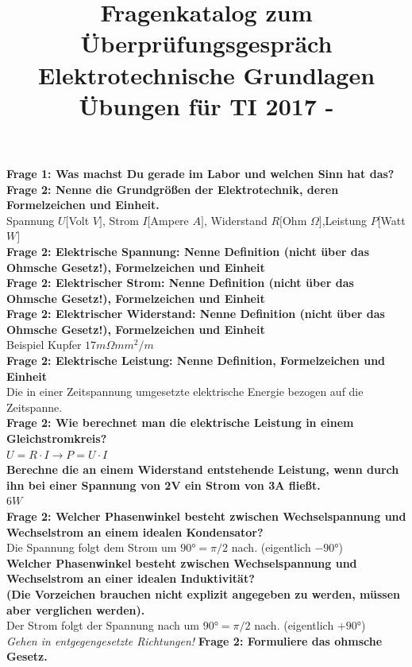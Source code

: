 \documentclass[11pt,a4paper]{scrartcl}
\title{\textbf{Fragenkatalog zum Überprüfungsgespräch Elektrotechnische Grundlagen Übungen für TI 2017 - \UE}}
\author{\name}
\begin{document}
\maketitle

\textbf{Frage 1: Was machst Du gerade im Labor und welchen Sinn hat das?}\\
\textbf{Frage 2: Nenne die Grundgrößen der Elektrotechnik, deren Formelzeichen und Einheit.}\\
Spannung $U[$Volt $V]$, Strom $I[$Ampere $A]$, Widerstand $R[$Ohm $\Omega]$,Leistung $P[$Watt $W]$\\
\textbf{Frage 2: Elektrische Spannung: Nenne Definition (nicht über das Ohmsche Gesetz!), Formelzeichen und Einheit}\\
\textbf{Frage 2: Elektrischer Strom: Nenne Definition (nicht über das Ohmsche Gesetz!), Formelzeichen und Einheit}\\
\textbf{Frage 2: Elektrischer Widerstand: Nenne Definition (nicht über das Ohmsche Gesetz!), Formelzeichen und Einheit}\\
Beispiel Kupfer $17m\Omega mm^2/m$\\
\textbf{Frage 2: Elektrische Leistung: Nenne Definition, Formelzeichen und Einheit}\\
Die in einer Zeitspannung umgesetzte elektrische Energie bezogen auf die Zeitspanne.\\
\textbf{Frage 2: Wie berechnet man die elektrische Leistung in einem Gleichstromkreis?}\\
$U=R \cdot I \rightarrow P=U \cdot I$\\
\textbf{Berechne die an einem Widerstand entstehende Leistung, wenn durch ihn bei einer Spannung von 2V ein Strom von 3A fließt.}\\
$6W$\\
\textbf{Frage 2: Welcher Phasenwinkel besteht zwischen Wechselspannung und Wechselstrom an einem idealen Kondensator?}\\
Die Spannung folgt dem Strom um $90°=\pi/2$ nach. (eigentlich $-90°$)\\
\textbf{Welcher Phasenwinkel besteht zwischen Wechselspannung und Wechselstrom an einer idealen Induktivität?\\
(Die Vorzeichen brauchen nicht explizit angegeben zu werden, müssen aber verglichen werden).}\\
Der Strom folgt der Spannung nach um $90°=\pi/2$ nach. (eigentlich $+90°$)\\
\textit{Gehen in entgegengesetzte Richtungen!}
\textbf{Frage 2: Formuliere das ohmsche Gesetz.}\\
\end{document}
